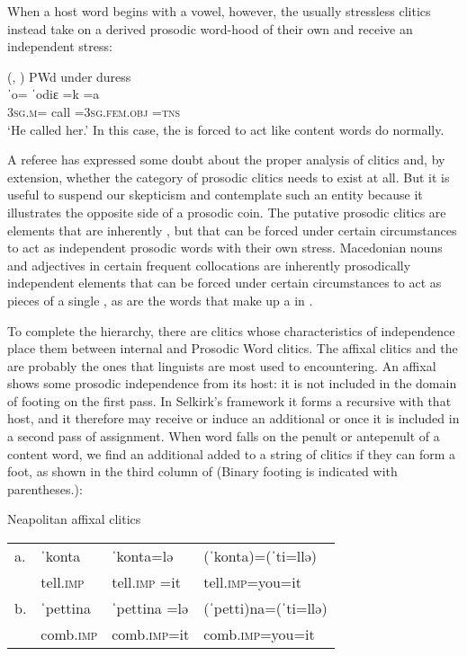 \documentclass[output=paper,
modfonts
]{LSP/langsci}
\begin{document}
\noindent When a host word begins with a vowel, however, the usually stressless clitics instead take on a derived prosodic word-hood of their own and receive an independent stress: 

\ea \label{ex:kaisse:7}  (\citealt{obata2003}, \citealt{anderson2011}) PWd  under duress\\
	\gll  ˈo=  {\squish ˈodiɛ} \squish=k \squish=a\\
	3\textsc{sg.m}=  {\squish call} \squish=\textsc{3sg.fem.obj} \squish\textsc{=tns}\\
	\glt  ‘He called her.’
\z
\noindent In this case, the  is forced to act like content words do normally.

A referee has expressed some doubt about the proper analysis of  clitics and, by extension, whether the category of prosodic clitics needs to exist at all. But it is useful to suspend our skepticism and contemplate such an entity because it illustrates the opposite side of a prosodic coin. The putative prosodic clitics are elements that are inherently , but that can be forced under certain circumstances to act as independent prosodic words with their own stress. Macedonian nouns and adjectives in certain frequent collocations are inherently prosodically independent elements that can be forced under certain circumstances to act as  pieces of a single , as are the words that make up a  in .

To complete the hierarchy, there are clitics whose characteristics of independence place them between internal and Prosodic Word clitics. The affixal clitics and the  are probably the ones that linguists are most used to encountering. An affixal  shows some prosodic independence from its host: it is not included in the domain of footing on the first pass. In Selkirk’s framework it forms a recursive  with that host, and it therefore may receive or induce an additional  or  once it is included in a second pass of  assignment. When word  falls on the penult or antepenult of a content word, we find an additional  added to a string of clitics if they can form a foot, as shown in the third column of  (Binary footing is indicated with parentheses.):

\ea \label{ex:kaisse:8} Neapolitan  \citep{peperkamp1997} affixal clitics\\
\begin{tabular}{llll}
a. & ˈkonta & ˈkonta=lə & (ˈkonta)=(ˈti=llə)\\
	& tell.\textsc{imp} & tell.\textsc{imp} \squish=it &  tell.\textsc{imp}=you=it\\
b. & ˈpettina &  ˈpettina =lə &  (ˈpetti)na=(ˈti=llə)\\
	&comb.\textsc{imp} & comb.\textsc{imp}=it &  comb.\textsc{imp}=you=it\\
\end{tabular}
\z
\end{document}
